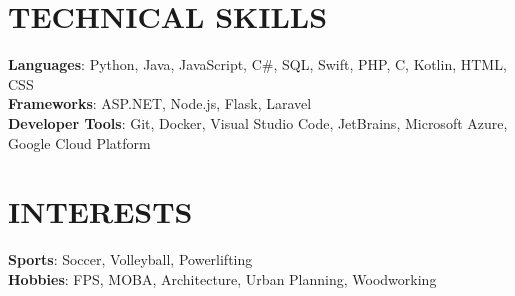 \documentclass[letterpaper,11pt]{article}
\begin{document}
\section{TECHNICAL SKILLS}
 \begin{itemize}[leftmargin=0.15in, label={}]
    \small{\item{
     \textbf{Languages}{: Python, Java, JavaScript, C\#, SQL, Swift, PHP, C, Kotlin, HTML, CSS} \\
     \textbf{Frameworks}{: ASP.NET, Node.js, Flask, Laravel} \\
     \textbf{Developer Tools}{: Git, Docker, Visual Studio Code, JetBrains, Microsoft Azure, Google Cloud Platform} \\
    }}
 \end{itemize}

\section{INTERESTS}
 \begin{itemize}[leftmargin=0.15in, label={}]
    \small{\item{
     \textbf{Sports}{: Soccer, Volleyball, Powerlifting} \\
     \textbf{Hobbies}{: FPS, MOBA, Architecture, Urban Planning, Woodworking} \\
    }}
 \end{itemize}

\end{document}
